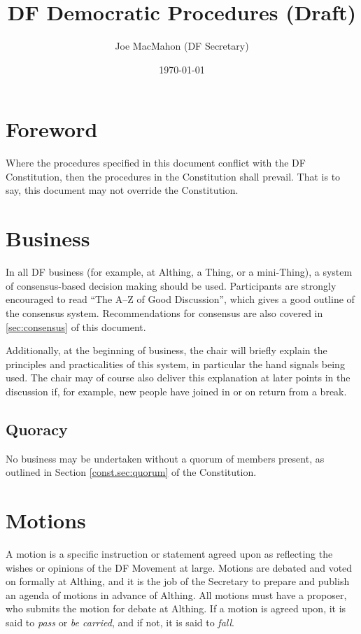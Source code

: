\documentclass[a4paper, 12pt]{article} %
\title{DF Democratic Procedures (Draft)}
\author{Joe MacMahon (DF Secretary)}
\date{\today}
\begin{document}
\maketitle

\tableofcontents

\section{Foreword}
Where the procedures specified in this document conflict with the DF Constitution, then the procedures in the Constitution shall prevail.  That is to say, this document may not override the Constitution.

\section{Business}
In all DF business (for example, at Althing, a Thing, or a mini-Thing), a system of consensus-based decision making should be used.  Participants are strongly encouraged to read ``The A--Z of Good Discussion'', which gives a good outline of the consensus system.  Recommendations for consensus are also covered in \autoref{sec:consensus} of this document.

Additionally, at the beginning of business, the chair will briefly explain the principles and practicalities of this system, in particular the hand signals being used.  The chair may of course also deliver this explanation at later points in the discussion if, for example, new people have joined in or on return from a break.

\subsection{Quoracy}
No business may be undertaken without a quorum of members present, as outlined in Section \autoref{const.sec:quorum} of the Constitution.

\section{Motions}
A motion is a specific instruction or statement agreed upon as reflecting the wishes or opinions of the DF Movement at large.  Motions are debated and voted on formally at Althing, and it is the job of the Secretary to prepare and publish an agenda of motions in advance of Althing.  All motions must have a proposer, who submits the motion for debate at Althing. If a motion is agreed upon, it is said to \emph{pass} or \emph{be carried}, and if not, it is said to \emph{fall}.
\end{document}

